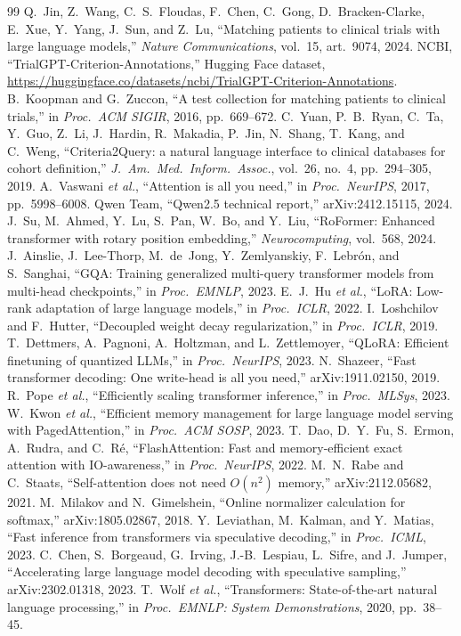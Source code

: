 \documentclass[conference]{IEEEtran}
\begin{document}
\begin{thebibliography}{99}
 Q.~Jin, Z.~Wang, C.~S.~Floudas, F.~Chen, C.~Gong, D.~Bracken-Clarke, E.~Xue, Y.~Yang, J.~Sun, and Z.~Lu, ``Matching patients to clinical trials with large language models,'' \emph{Nature Communications}, vol.~15, art.~9074, 2024.
 NCBI, ``TrialGPT-Criterion-Annotations,'' Hugging Face dataset, \url{https://huggingface.co/datasets/ncbi/TrialGPT-Criterion-Annotations}.
 B.~Koopman and G.~Zuccon, ``A test collection for matching patients to clinical trials,'' in \emph{Proc.\ ACM SIGIR}, 2016, pp.~669--672.
 C.~Yuan, P.~B.~Ryan, C.~Ta, Y.~Guo, Z.~Li, J.~Hardin, R.~Makadia, P.~Jin, N.~Shang, T.~Kang, and C.~Weng, ``Criteria2Query: a natural language interface to clinical databases for cohort definition,'' \emph{J.\ Am.\ Med.\ Inform.\ Assoc.}, vol.~26, no.~4, pp.~294--305, 2019.
 A.~Vaswani \emph{et al.}, ``Attention is all you need,'' in \emph{Proc.\ NeurIPS}, 2017, pp.~5998--6008.
 Qwen Team, ``Qwen2.5 technical report,'' arXiv:2412.15115, 2024.
 J.~Su, M.~Ahmed, Y.~Lu, S.~Pan, W.~Bo, and Y.~Liu, ``RoFormer: Enhanced transformer with rotary position embedding,'' \emph{Neurocomputing}, vol.~568, 2024.
 J.~Ainslie, J.~Lee-Thorp, M.~de~Jong, Y.~Zemlyanskiy, F.~Lebr\'on, and S.~Sanghai, ``GQA: Training generalized multi-query transformer models from multi-head checkpoints,'' in \emph{Proc.\ EMNLP}, 2023.
 E.~J.~Hu \emph{et al.}, ``LoRA: Low-rank adaptation of large language models,'' in \emph{Proc.\ ICLR}, 2022.
 I.~Loshchilov and F.~Hutter, ``Decoupled weight decay regularization,'' in \emph{Proc.\ ICLR}, 2019.
 T.~Dettmers, A.~Pagnoni, A.~Holtzman, and L.~Zettlemoyer, ``QLoRA: Efficient finetuning of quantized LLMs,'' in \emph{Proc.\ NeurIPS}, 2023.
 N.~Shazeer, ``Fast transformer decoding: One write-head is all you need,'' arXiv:1911.02150, 2019.
 R.~Pope \emph{et al.}, ``Efficiently scaling transformer inference,'' in \emph{Proc.\ MLSys}, 2023.
 W.~Kwon \emph{et al.}, ``Efficient memory management for large language model serving with PagedAttention,'' in \emph{Proc.\ ACM SOSP}, 2023.
 T.~Dao, D.~Y.~Fu, S.~Ermon, A.~Rudra, and C.~R\'e, ``FlashAttention: Fast and memory-efficient exact attention with IO-awareness,'' in \emph{Proc.\ NeurIPS}, 2022.
 M.~N.~Rabe and C.~Staats, ``Self-attention does not need $O(n^2)$ memory,'' arXiv:2112.05682, 2021.
 M.~Milakov and N.~Gimelshein, ``Online normalizer calculation for softmax,'' arXiv:1805.02867, 2018.
 Y.~Leviathan, M.~Kalman, and Y.~Matias, ``Fast inference from transformers via speculative decoding,'' in \emph{Proc.\ ICML}, 2023.
 C.~Chen, S.~Borgeaud, G.~Irving, J.-B.~Lespiau, L.~Sifre, and J.~Jumper, ``Accelerating large language model decoding with speculative sampling,'' arXiv:2302.01318, 2023.
 T.~Wolf \emph{et al.}, ``Transformers: State-of-the-art natural language processing,'' in \emph{Proc.\ EMNLP: System Demonstrations}, 2020, pp.~38--45.
\end{thebibliography}
\end{document}
